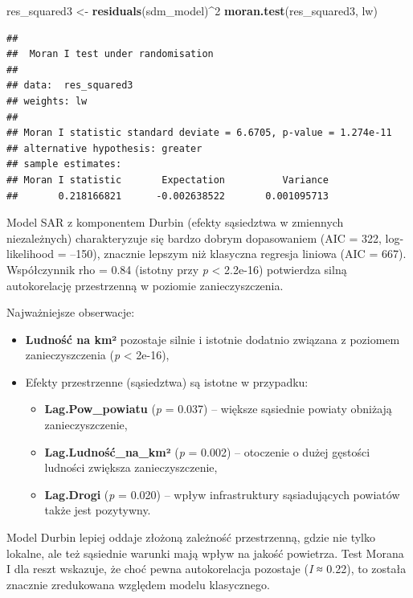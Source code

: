 \documentclass[
  11pt,
]{article}
\newenvironment{Shaded}{\begin{snugshade}}{\end{snugshade}}
\newcommand{\DecValTok}[1]{\textcolor[rgb]{0.00,0.00,0.81}{#1}}
\newcommand{\FunctionTok}[1]{\textcolor[rgb]{0.13,0.29,0.53}{\textbf{#1}}}
\newcommand{\NormalTok}[1]{#1}
\newcommand{\OtherTok}[1]{\textcolor[rgb]{0.56,0.35,0.01}{#1}}
\newcommand{\SpecialCharTok}[1]{\textcolor[rgb]{0.81,0.36,0.00}{\textbf{#1}}}
\begin{document}
\begin{Shaded}
\begin{Highlighting}[]
\NormalTok{res\_squared3 }\OtherTok{\textless{}{-}} \FunctionTok{residuals}\NormalTok{(sdm\_model)}\SpecialCharTok{\^{}}\DecValTok{2}
\FunctionTok{moran.test}\NormalTok{(res\_squared3, lw)}
\end{Highlighting}
\end{Shaded}

\begin{verbatim}
## 
##  Moran I test under randomisation
## 
## data:  res_squared3  
## weights: lw    
## 
## Moran I statistic standard deviate = 6.6705, p-value = 1.274e-11
## alternative hypothesis: greater
## sample estimates:
## Moran I statistic       Expectation          Variance 
##       0.218166821      -0.002638522       0.001095713
\end{verbatim}

Model SAR z komponentem Durbin (efekty sąsiedztwa w zmiennych
niezależnych) charakteryzuje się bardzo dobrym dopasowaniem (AIC = 322,
log-likelihood = --150), znacznie lepszym niż klasyczna regresja liniowa
(AIC = 667). Współczynnik rho = 0.84 (istotny przy \emph{p} \textless{}
2.2e-16) potwierdza silną autokorelację przestrzenną w poziomie
zanieczyszczenia.

Najważniejsze obserwacje:

\begin{itemize}
\item
  \textbf{Ludność na km²} pozostaje silnie i istotnie dodatnio związana
  z poziomem zanieczyszczenia (\emph{p} \textless{} 2e-16),
\item
  Efekty przestrzenne (sąsiedztwa) są istotne w przypadku:

  \begin{itemize}
  \item
    \textbf{Lag.Pow\_powiatu} (\emph{p} = 0.037) -- większe sąsiednie
    powiaty obniżają zanieczyszczenie,
  \item
    \textbf{Lag.Ludność\_na\_km²} (\emph{p} = 0.002) -- otoczenie o
    dużej gęstości ludności zwiększa zanieczyszczenie,
  \item
    \textbf{Lag.Drogi} (\emph{p} = 0.020) -- wpływ infrastruktury
    sąsiadujących powiatów także jest pozytywny.
  \end{itemize}
\end{itemize}

Model Durbin lepiej oddaje złożoną zależność przestrzenną, gdzie nie
tylko lokalne, ale też sąsiednie warunki mają wpływ na jakość powietrza.
Test Morana I dla reszt wskazuje, że choć pewna autokorelacja pozostaje
(\emph{I} ≈ 0.22), to została znacznie zredukowana względem modelu
klasycznego.
\end{document}
